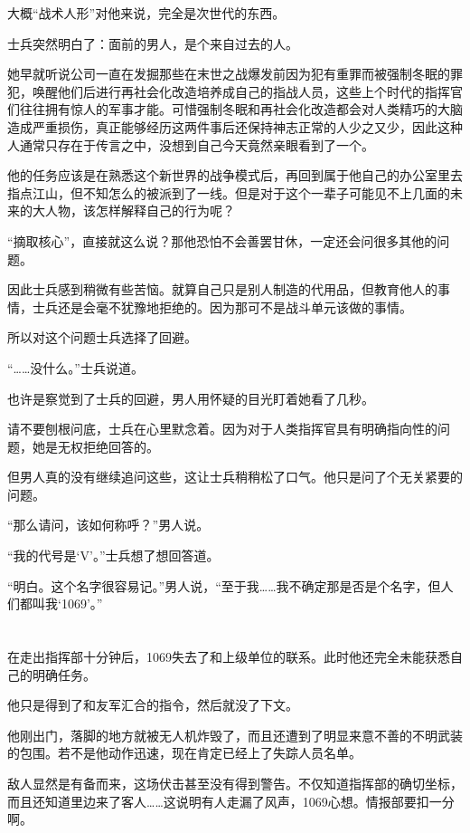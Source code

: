 大概“战术人形”对他来说，完全是次世代的东西。

士兵突然明白了：面前的男人，是个来自过去的人。

她早就听说公司一直在发掘那些在末世之战爆发前因为犯有重罪而被强制冬眠的罪犯，唤醒他们后进行再社会化改造培养成自己的指战人员，这些上个时代的指挥官们往往拥有惊人的军事才能。可惜强制冬眠和再社会化改造都会对人类精巧的大脑造成严重损伤，真正能够经历这两件事后还保持神志正常的人少之又少，因此这种人通常只存在于传言之中，没想到自己今天竟然亲眼看到了一个。

他的任务应该是在熟悉这个新世界的战争模式后，再回到属于他自己的办公室里去指点江山，但不知怎么的被派到了一线。但是对于这个一辈子可能见不上几面的未来的大人物，该怎样解释自己的行为呢？

“摘取核心”，直接就这么说？那他恐怕不会善罢甘休，一定还会问很多其他的问题。

因此士兵感到稍微有些苦恼。就算自己只是别人制造的代用品，但教育他人的事情，士兵还是会毫不犹豫地拒绝的。因为那可不是战斗单元该做的事情。

所以对这个问题士兵选择了回避。

“……没什么。”士兵说道。

也许是察觉到了士兵的回避，男人用怀疑的目光盯着她看了几秒。

请不要刨根问底，士兵在心里默念着。因为对于人类指挥官具有明确指向性的问题，她是无权拒绝回答的。

但男人真的没有继续追问这些，这让士兵稍稍松了口气。他只是问了个无关紧要的问题。

“那么请问，该如何称呼？”男人说。

“我的代号是‘V’。”士兵想了想回答道。

“明白。这个名字很容易记。”男人说，“至于我……我不确定那是否是个名字，但人们都叫我‘1069’。”

\section*{}

在走出指挥部十分钟后，1069失去了和上级单位的联系。此时他还完全未能获悉自己的明确任务。

他只是得到了和友军汇合的指令，然后就没了下文。

他刚出门，落脚的地方就被无人机炸毁了，而且还遭到了明显来意不善的不明武装的包围。若不是他动作迅速，现在肯定已经上了失踪人员名单。

敌人显然是有备而来，这场伏击甚至没有得到警告。不仅知道指挥部的确切坐标，而且还知道里边来了客人……这说明有人走漏了风声，1069心想。情报部要扣一分啊。

